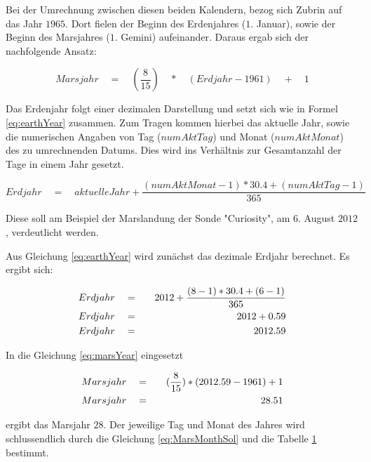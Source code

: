 \begin{figure}[H]
	\centering
	\label{fig:marsEarthCalendar}
\end{figure}

Bei der Umrechnung zwischen diesen beiden Kalendern, bezog sich Zubrin auf das
Jahr $1965$. Dort fielen der Beginn des Erdenjahres ($1.$ Januar), sowie der
Beginn des Marsjahres ($1.$ Gemini) aufeinander. Daraus ergab sich der
nachfolgende Ansatz:

\begin{equation}
	Marsjahr \quad = \quad (\frac{8}{15}) \quad * \quad (Erdjahr - 1961) \quad + \quad 1
	\label{eq:marsYear}
\end{equation}

Das Erdenjahr folgt einer dezimalen Darstellung und setzt sich wie in Formel
\ref{eq:earthYear} zusammen. Zum Tragen kommen hierbei das aktuelle Jahr, sowie
die numerischen Angaben von Tag ($numAktTag$) und Monat ($numAktMonat$) des zu
umrechnenden Datums. Dies wird ins Verhältnis zur Gesamtanzahl der Tage in einem
Jahr gesetzt.

\begin{equation}
	Erdjahr \quad = \quad aktuelleJahr + \frac{ (numAktMonat - 1) * 30.4 + (numAktTag - 1) }{365}
	\label{eq:earthYear}
\end{equation}

Diese soll am Beispiel der Marslandung der Sonde "Curiosity", am $6.$ August
$2012$, verdeutlicht werden.

Aus Gleichung \ref{eq:earthYear} wird zunächst das dezimale Erdjahr berechnet.
Es ergibt sich:

\begin{eqnarray}
	Erdjahr \quad & = & \quad 2012 + \frac{ (8-1) * 30.4 + (6-1) }{365} \notag\\
	Erdjahr \quad & = & \quad 2012 + 0.59 \notag\\
	Erdjahr \quad & = & \quad 2012.59
\end{eqnarray}

In die Gleichung \ref{eq:marsYear} eingesetzt

\begin{eqnarray}
	Marsjahr \quad & = & \quad (\frac{8}{15}) * (2012.59 - 1961) + 1 \notag\\
	Marsjahr \quad & = & \quad 28.51
\end{eqnarray}

ergibt das Marsjahr $28$. Der jeweilige Tag und Monat des Jahres wird
schlussendlich durch die Gleichung \ref{eq:MarsMonthSol} und die Tabelle
\ref{fig:marsEarthCalendar} bestimmt.

